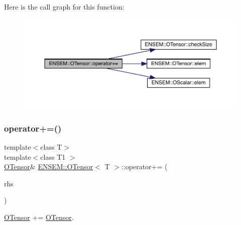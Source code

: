 Here is the call graph for this function\+:
\nopagebreak
\begin{figure}[H]
\begin{center}
\leavevmode
\includegraphics[width=350pt]{da/d8a/classENSEM_1_1OTensor_a93fe0d4638104ad0f6bdaf5de7760276_cgraph}
\end{center}
\end{figure}
\mbox{\label{classENSEM_1_1OTensor_a621ebf0d6d94eb56c1e3b31cb8c933b1}} 
\subsubsection{\texorpdfstring{operator+=()}{operator+=()}\hspace{0.1cm}{\footnotesize\ttfamily [4/6]}}
{\footnotesize\ttfamily template$<$class T$>$ \\
template$<$class T1 $>$ \\
\mbox{\hyperlink{classENSEM_1_1OTensor}{O\+Tensor}}\& \mbox{\hyperlink{classENSEM_1_1OTensor}{E\+N\+S\+E\+M\+::\+O\+Tensor}}$<$ T $>$\+::operator+= (\begin{DoxyParamCaption}\item[{const \mbox{\hyperlink{classENSEM_1_1OTensor}{O\+Tensor}}$<$ T1 $>$ \&}]{rhs }\end{DoxyParamCaption})\hspace{0.3cm}{\ttfamily [inline]}}



\mbox{\hyperlink{classENSEM_1_1OTensor}{O\+Tensor}} += \mbox{\hyperlink{classENSEM_1_1OTensor}{O\+Tensor}}. 

